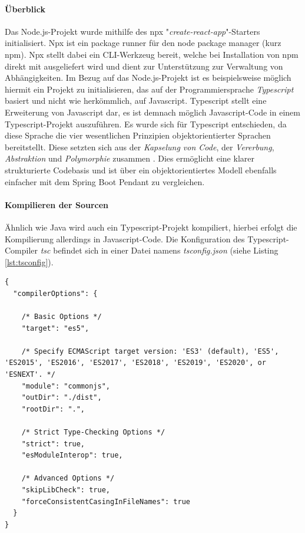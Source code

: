 \paragraph{Überblick \checkmark}
Das Node.js-Projekt wurde mithilfe des npx "\emph{create-react-app}"-Starters initialisiert. Npx ist ein package runner für den node package manager (kurz npm). Npx stellt dabei ein CLI-Werkzeug bereit, welche bei Installation von npm direkt mit ausgeliefert wird und dient zur Unterstützung zur Verwaltung von Abhängigkeiten. Im Bezug auf das Node.js-Projekt ist es beispielsweise möglich hiermit ein Projekt zu initialisieren, das auf der Programmiersprache \emph{Typescript} basiert und nicht wie herkömmlich, auf Javascript. Typescript stellt eine Erweiterung von Javascript dar, es ist demnach möglich Javascript-Code in einem Typescript-Projekt auszuführen. Es wurde sich für Typescript entschieden, da diese Sprache die vier wesentlichen Prinzipien objektorientierter Sprachen bereitstellt. Diese setzten sich aus der \emph{Kapselung von Code}, der \emph{Vererbung}, \emph{Abstraktion} und \emph{Polymorphie} zusammen \cite{typescript-oop}. Dies ermöglicht eine klarer strukturierte Codebasis und ist über ein objektorientiertes Modell ebenfalls einfacher mit dem Spring Boot Pendant zu vergleichen.

\paragraph{Kompilieren der Sourcen \checkmark}
Ähnlich wie Java wird auch ein Typescript-Projekt kompiliert, hierbei erfolgt die Kompilierung allerdings in Javascript-Code. Die Konfiguration des Typescript-Compiler \emph{tsc} befindet sich in einer Datei namens \emph{tsconfig.json} (siehe Listing \ref{lst:tsconfig}).

\begin{minipage}{\linewidth}
\begin{lstlisting}[style=javaStyle,caption={tsconfig.json},label=lst:tsconfig]
  {
  "compilerOptions": {

    /* Basic Options */
    "target": "es5",

    /* Specify ECMAScript target version: 'ES3' (default), 'ES5', 'ES2015', 'ES2016', 'ES2017', 'ES2018', 'ES2019', 'ES2020', or 'ESNEXT'. */
    "module": "commonjs",
    "outDir": "./dist",
    "rootDir": ".",

    /* Strict Type-Checking Options */
    "strict": true,
    "esModuleInterop": true,

    /* Advanced Options */
    "skipLibCheck": true,
    "forceConsistentCasingInFileNames": true
  }
}

\end{lstlisting}
\end{minipage}

